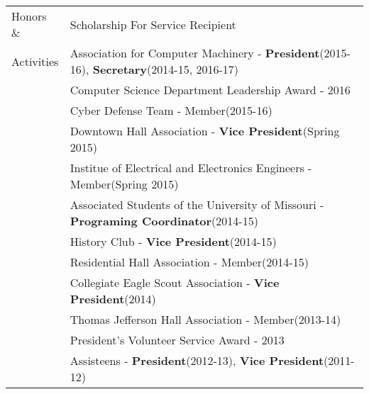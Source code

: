 \documentclass{article}
\begin{document}
\begin{tabular}{p{1.5cm} l}
Honors \&	& Scholarship For Service Recipient 																		\\
Activities	& Association for Computer Machinery - \textbf{President}(2015-16), \textbf{Secretary}(2014-15, 2016-17)	\\
			& Computer Science Department Leadership Award - 2016														\\
			& Cyber Defense Team - Member(2015-16) 																		\\
			& Downtown Hall Association - \textbf{Vice President}(Spring 2015)											\\
			& Institue of Electrical and Electronics Engineers - Member(Spring 2015)									\\
			& Associated Students of the University of Missouri - \textbf{Programing Coordinator}(2014-15)				\\
			& History Club - \textbf{Vice President}(2014-15) 															\\
			& Residential Hall Association - Member(2014-15) 															\\
			& Collegiate Eagle Scout Association - \textbf{Vice President}(2014) 										\\
			& Thomas Jefferson Hall Association - Member(2013-14) 														\\
			& President's Volunteer Service Award - 2013																\\
			& Assisteens - \textbf{President}(2012-13), \textbf{Vice President}(2011-12)								\\
\end{tabular}
\end{document}
